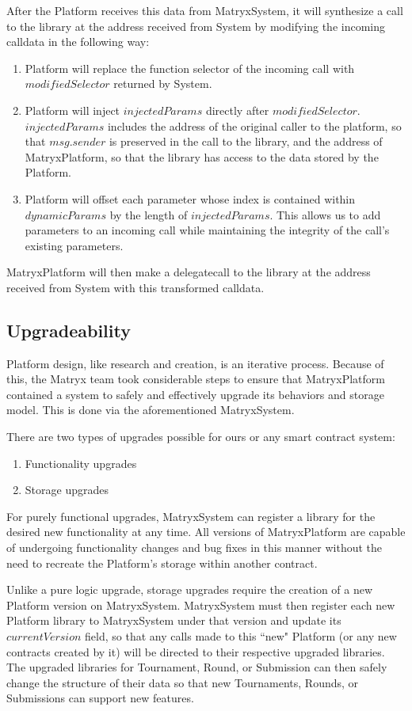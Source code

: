 \documentclass[a4paper, 10pt, conference]{ieeeconf}      %
\begin{document}
After the Platform receives this data from MatryxSystem, it will synthesize a call to the library at the address received from System by modifying the incoming calldata in the following way:
\begin{enumerate}
\item Platform will replace the function selector of the incoming call with $modifiedSelector$ returned by System.
\item Platform will inject $injectedParams$ directly after $modifiedSelector$. $injectedParams$ includes the address of the original caller to the platform, so that $msg.sender$ is preserved in the call to the library, and the address of MatryxPlatform, so that the library has access to the data stored by the Platform.
\item Platform will offset each parameter whose index is contained within $dynamicParams$ by the length of $injectedParams$. This allows us to add parameters to an incoming call while maintaining the integrity of the call's existing parameters.
\end{enumerate}

MatryxPlatform will then make a delegatecall to the library at the address received from System with this transformed calldata.

\subsection{Upgradeability}\label{upgradeability}
Platform design, like research and creation, is an iterative process. Because of this, the Matryx team took considerable steps to ensure that MatryxPlatform contained a system to safely and effectively upgrade its behaviors and storage model.
This is done via the aforementioned MatryxSystem.

There are two types of upgrades possible for ours or any smart contract system:
\begin{enumerate}
\item Functionality upgrades
\item Storage upgrades
\end{enumerate}
For purely functional upgrades, MatryxSystem can register a library for the desired new functionality at any time. All versions of MatryxPlatform are capable of undergoing functionality changes and bug fixes in this manner without the need to recreate the Platform’s storage within another contract. 

Unlike a pure logic upgrade, storage upgrades require the creation of a new Platform version on MatryxSystem. MatryxSystem must then register each new Platform library to MatryxSystem under that version and update its $currentVersion$ field, so that any calls made to this ``new" Platform (or any new contracts created by it) will be directed to their respective upgraded libraries. The upgraded libraries for Tournament, Round, or Submission can then safely change the structure of their data so that new Tournaments, Rounds, or Submissions can support new features.
\end{document}
